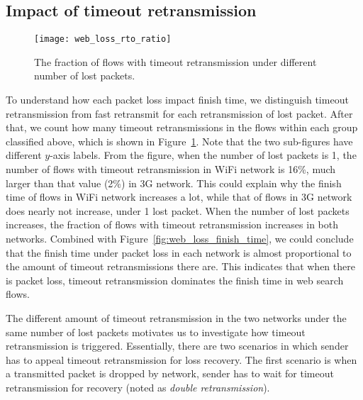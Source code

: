 \subsection{Impact of timeout retransmission}

\begin{figure}[th]
\centering
\texttt{[image: web\_loss\_rto\_ratio]}
\caption{The fraction of flows with timeout retransmission under different number of lost packets.}
\label{fig:web_loss_rto_ratio}
\end{figure}

To understand how each packet loss impact finish time, we distinguish timeout retransmission from fast retransmit for each retransmission of lost packet. After that, we count how many timeout retransmissions in the flows within each group classified above, which is shown in Figure~\ref{fig:web_loss_rto_ratio}. Note that the two sub-figures have different $y$-axis labels. From the figure, when the number of lost packets is 1, the number of flows with timeout retransmission in WiFi network is 16\%, much larger than that value (2\%) in 3G network. This could explain why the finish time of flows in WiFi network increases a lot, while that of flows in 3G network does nearly not increase, under 1 lost packet. When the number of lost packets increases, the fraction of flows with timeout retransmission increases in both networks. Combined with Figure~\ref{fig:web_loss_finish_time}, we could conclude that the finish time under packet loss in each network is almost proportional to the amount of timeout retransmissions there are. This indicates that when there is packet loss, timeout retransmission dominates the finish time in web search flows.

The different amount of timeout retransmission in the two networks under the same number of lost packets motivates us to investigate how timeout retransmission is triggered. Essentially, there are two scenarios in which sender has to appeal timeout retransmission for loss recovery. The first scenario is when a transmitted packet is dropped by network, sender has to wait for timeout retransmission for recovery (noted as \emph{double retransmission}). 


